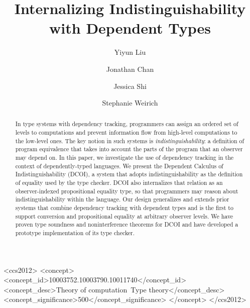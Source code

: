 \documentclass[acmsmall]{acmart}
\begin{document}
\title{Internalizing Indistinguishability with Dependent Types}

\author{Yiyun Liu}

\author{Jonathan Chan}

\author{Jessica Shi}

\author{Stephanie Weirich}


\begin{CCSXML}
<ccs2012>
   <concept>
       <concept_id>10003752.10003790.10011740</concept_id>
       <concept_desc>Theory of computation~Type theory</concept_desc>
       <concept_significance>500</concept_significance>
       </concept>
 </ccs2012>
\end{CCSXML}



\begin{abstract}
  In type systems with dependency tracking, programmers can assign an ordered
  set of levels to computations and prevent information flow from high-level
  computations to the low-level ones. The key notion in such systems is
  \emph{indistinguishability}: a definition of program equivalence that takes
  into account the parts of the program that an observer may depend on.  In
  this paper, we investigate the use of dependency tracking in the context of
  dependently-typed languages. We present the Dependent Calculus of
  Indistinguishability (DCOI), a system that adopts indistinguishability as
  the definition of equality used by the type checker. DCOI also internalizes
  that relation as an observer-indexed propositional equality type, so that
  programmers may reason about indistinguishability within the language. Our
  design generalizes and extends prior systems that combine dependency
  tracking with dependent types and is the first to support conversion and
  propositional equality at arbitrary observer levels.  We have proven type
  soundness and noninterference theorems for DCOI and have developed a
  prototype implementation of its type checker.
\end{abstract}
\end{document}
